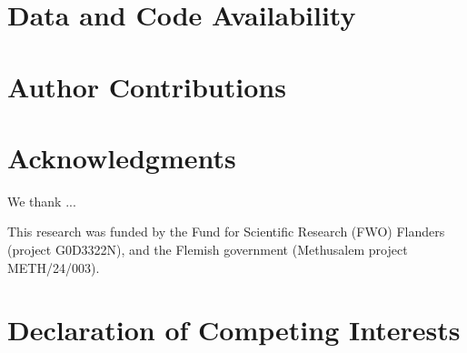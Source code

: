 \documentclass[preprint,12pt]{elsarticle}
\begin{document}
\section{Data and Code Availability}

\section{Author Contributions}

\section{Acknowledgments}
We thank ...

This research was funded by the Fund for Scientific Research (FWO) Flanders (project G0D3322N), and the Flemish government (Methusalem project METH/24/003).

\section{Declaration of Competing Interests}

\clearpage
% 
 

\clearpage


\end{document}
